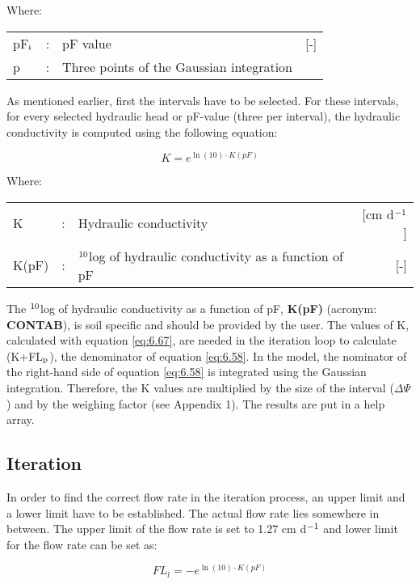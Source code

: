 Where:\\[5pt]
\begin{tabularx}{\textwidth}{llXr}
pF$_{{\rm i}}$ &:& pF value  & [-]\\
p &:& Three points of the Gaussian integration\\
\end{tabularx}

As mentioned earlier, first the intervals have to be selected. For these intervals, for every
selected hydraulic head or pF-value (three per interval), the hydraulic conductivity is
computed using the following equation:

\begin{equation}
\label{eq:6.67}
K = e^{\ln(10) \cdot K(pF)} 
\end{equation}

Where:\\[5pt]
\begin{tabularx}{\textwidth}{llXr}
K &:& Hydraulic conductivity  & [cm d$^{{\rm -1}}$]\\
K(pF) &:& $^{{\rm 10}}$log of hydraulic conductivity as a function of pF  & [-]\\
\end{tabularx}

The $^{{\rm 10}}$log of hydraulic conductivity as a function of pF, {\bf K(pF)} 
(acronym: {\bf CONTAB}), is soil specific and should be provided by the user.
The values of K, calculated with equation \ref{eq:6.67}, are needed in the iteration loop to
calculate (K+FL$_{{\rm p}}$), the denominator of equation \ref{eq:6.58}. In the model, the nominator of the
right-hand side of equation \ref{eq:6.58} is integrated using the Gaussian integration. Therefore,
the K values are multiplied by the size of the interval ($\Delta$$\Psi$) and by the weighing factor
(see Appendix 1). The results are put in a help array.

\subsection{Iteration}
In order to find the correct flow rate in the iteration process, an upper limit and a lower
limit have to be established. The actual flow rate lies somewhere in between. The upper
limit of the flow rate is set to 1.27 cm d$^{{\rm -1}}$ and lower limit for the flow rate can be set as:

\begin{equation}
\label{eq:6.68}
FL_{l} = - e^{\ln(10) \cdot K(pF)}
\end{equation}

